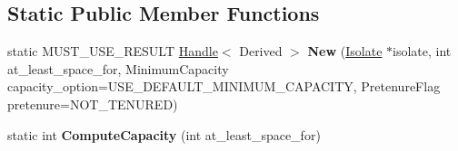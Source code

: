 \subsection*{Static Public Member Functions}
\begin{DoxyCompactItemize}
\item 
\hypertarget{classv8_1_1internal_1_1_hash_table_a5c1574b25a07f84761ee8f420102dbd5}{}static M\+U\+S\+T\+\_\+\+U\+S\+E\+\_\+\+R\+E\+S\+U\+L\+T \hyperlink{classv8_1_1internal_1_1_handle}{Handle}$<$ Derived $>$ {\bfseries New} (\hyperlink{classv8_1_1internal_1_1_isolate}{Isolate} $\ast$isolate, int at\+\_\+least\+\_\+space\+\_\+for, Minimum\+Capacity capacity\+\_\+option=U\+S\+E\+\_\+\+D\+E\+F\+A\+U\+L\+T\+\_\+\+M\+I\+N\+I\+M\+U\+M\+\_\+\+C\+A\+P\+A\+C\+I\+T\+Y, Pretenure\+Flag pretenure=N\+O\+T\+\_\+\+T\+E\+N\+U\+R\+E\+D)\label{classv8_1_1internal_1_1_hash_table_a5c1574b25a07f84761ee8f420102dbd5}

\item 
\hypertarget{classv8_1_1internal_1_1_hash_table_a0f4ec26bc035bd64d192af7127efb318}{}static int {\bfseries Compute\+Capacity} (int at\+\_\+least\+\_\+space\+\_\+for)\label{classv8_1_1internal_1_1_hash_table_a0f4ec26bc035bd64d192af7127efb318}

\end{DoxyCompactItemize}
